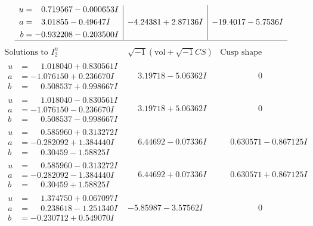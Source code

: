 \documentclass[1p]{elsarticle_modified}
\theoremstyle{definition}
\newcommand{\I}{\sqrt{-1}}
\begin{document}
$$\begin{array}{c|c|c}
\begin{aligned}
u &= \phantom{-}0.719567 - 0.000653 I \\
a &= \phantom{-}3.01855 - 0.49647 I \\
b &= -0.932208 - 0.203500 I\end{aligned}
 & -4.24381 + 2.87136 I & -19.4017 - 5.7536 I\\
 \hline 
 \end{array}$$\newpage$$\begin{array}{c|c|c}  
\text{Solutions to }I^u_{2}& \I (\text{vol} + \sqrt{-1}CS) & \text{Cusp shape}\\
 \hline 
\begin{aligned}
u &= \phantom{-}1.018040 + 0.830561 I \\
a &= -1.076150 + 0.236670 I \\
b &= \phantom{-}0.508537 + 0.998667 I\end{aligned}
 & \phantom{-}3.19718 - 5.06362 I & \phantom{-0.000000 } 0 \\ \hline\begin{aligned}
u &= \phantom{-}1.018040 - 0.830561 I \\
a &= -1.076150 - 0.236670 I \\
b &= \phantom{-}0.508537 - 0.998667 I\end{aligned}
 & \phantom{-}3.19718 + 5.06362 I & \phantom{-0.000000 } 0 \\ \hline\begin{aligned}
u &= \phantom{-}0.585960 + 0.313272 I \\
a &= -0.282092 + 1.384440 I \\
b &= \phantom{-}0.30459 - 1.58825 I\end{aligned}
 & \phantom{-}6.44692 - 0.07336 I & \phantom{-}0.630571 - 0.867125 I \\ \hline\begin{aligned}
u &= \phantom{-}0.585960 - 0.313272 I \\
a &= -0.282092 - 1.384440 I \\
b &= \phantom{-}0.30459 + 1.58825 I\end{aligned}
 & \phantom{-}6.44692 + 0.07336 I & \phantom{-}0.630571 + 0.867125 I \\ \hline\begin{aligned}
u &= \phantom{-}1.374750 + 0.067097 I \\
a &= \phantom{-}0.238618 - 1.251340 I \\
b &= -0.230712 + 0.549070 I\end{aligned}
 & -5.85987 - 3.57562 I & \phantom{-0.000000 } 0 \\ \hline\begin{aligned}

\end{aligned}
\end{array}$$
\end{document}
